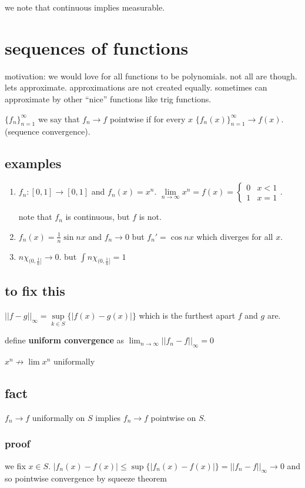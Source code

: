 \documentclass[letterpaper]{article}
\begin{document}
we note that continuous implies measurable.

\section*{sequences of functions}
motivation: we would love for all functions to be polynomials. not all are though. lets approximate. approximations are not created equally. sometimes can approximate by other ``nice'' functions like trig functions.

$\{f_n\}_{n=1}^\infty$ we say that $f_n\to f$ pointwise if for every $x$ $\{f_n(x)\}_{n=1}^\infty\to f(x)$. (sequence convergence).

\subsection*{examples}
\begin{enumerate}
\item
$f_n:[0,1]\to[0,1]$ and $f_n(x)=x^n$. $\lim\limits_{n\to\infty}x^n=f(x)=\begin{cases}0&x<1\\1&x=1\end{cases}$.

note that $f_n$ is continuous, but $f$ is not.
\item
$f_n(x)=\frac{1}{n}\sin nx$ and $f_n\to0$ but $f_n'=\cos nx$ which diverges for all $x$.
\item
$n\chi_{(0,\frac{1}{n}]}\to 0$. but $\int{n\chi_{(0,\frac{1}{n}]}}=1$

\end{enumerate}
\subsection*{to fix this}
$||f-g||_\infty=\sup\limits_{k\in S}\{|f(x)-g(x)|\}$ which is the furthest apart $f$ and $g$ are.

define {\bfseries uniform convergence} as $\lim_{n\to\infty}||f_n-f||_\infty=0$

$x^n\not\to\lim x^n$ uniformally

\subsection*{fact}
$f_n\to f$ uniformally on $S$ implies $f_n\to f$ pointwise on $S$.
\subsubsection*{proof}
we fix $x\in S$. $|f_n(x)-f(x)|\le \sup\{|f_n(x)-f(x)|\}=||f_n-f||_\infty\to 0$ and so pointwise convergence by  squeeze theorem
\end{document}
